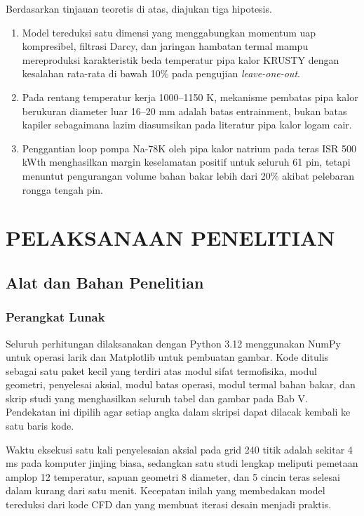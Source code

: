 \documentclass[
  indonesian,
  12pt,
  a4paper,
]{report}
\providecommand{\tightlist}{%
  \setlength{\itemsep}{0pt}\setlength{\parskip}{0pt}}
\begin{document}
Berdasarkan tinjauan teoretis di atas, diajukan tiga hipotesis.

\begin{enumerate}
\def\labelenumi{\arabic{enumi}.}
\tightlist
\item
  Model tereduksi satu dimensi yang menggabungkan momentum uap
  kompresibel, filtrasi Darcy, dan jaringan hambatan termal mampu
  mereproduksi karakteristik beda temperatur pipa kalor KRUSTY dengan
  kesalahan rata-rata di bawah 10\% pada pengujian \emph{leave-one-out}.
\item
  Pada rentang temperatur kerja 1000--1150 K, mekanisme pembatas pipa
  kalor berukuran diameter luar 16--20 mm adalah batas entrainment,
  bukan batas kapiler sebagaimana lazim diasumsikan pada literatur pipa
  kalor logam cair.
\item
  Penggantian loop pompa Na-78K oleh pipa kalor natrium pada teras ISR
  500 kWth menghasilkan margin keselamatan positif untuk seluruh 61 pin,
  tetapi menuntut pengurangan volume bahan bakar lebih dari 20\% akibat
  pelebaran rongga tengah pin.
\end{enumerate}

\chapter{PELAKSANAAN PENELITIAN}\label{pelaksanaan-penelitian}

\section{Alat dan Bahan Penelitian}\label{alat-dan-bahan-penelitian}

\subsection{Perangkat Lunak}\label{perangkat-lunak}

Seluruh perhitungan dilaksanakan dengan Python 3.12 menggunakan NumPy
untuk operasi larik dan Matplotlib untuk pembuatan gambar. Kode ditulis
sebagai satu paket kecil yang terdiri atas modul sifat termofisika,
modul geometri, penyelesai aksial, modul batas operasi, modul termal
bahan bakar, dan skrip studi yang menghasilkan seluruh tabel dan gambar
pada Bab V. Pendekatan ini dipilih agar setiap angka dalam skripsi dapat
dilacak kembali ke satu baris kode.

Waktu eksekusi satu kali penyelesaian aksial pada grid 240 titik adalah
sekitar 4 ms pada komputer jinjing biasa, sedangkan satu studi lengkap
meliputi pemetaan amplop 12 temperatur, sapuan geometri 8 diameter, dan
5 cincin teras selesai dalam kurang dari satu menit. Kecepatan inilah
yang membedakan model tereduksi dari kode CFD dan yang membuat iterasi
desain menjadi praktis.
\end{document}
